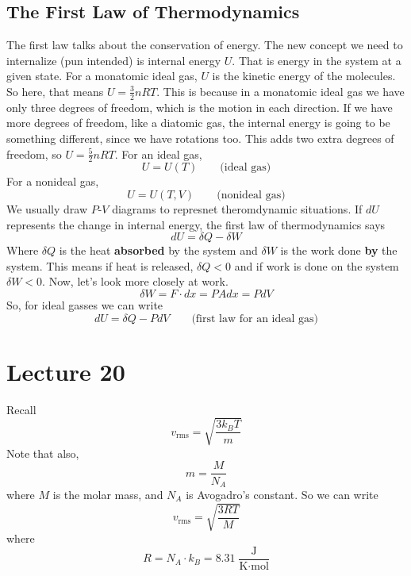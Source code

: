 \documentclass{report}
\numberwithin{equation}{section}
\begin{document}
\subsection{The First Law of Thermodynamics}
The first law talks about the conservation of energy. The new concept we need to internalize (pun intended) is internal energy $U$. That is energy in the system 
at a given state. For a monatomic ideal gas, $U$ is the kinetic energy of the molecules. So here, that means $U = \frac{3}{2}nRT$. This is because in a monatomic ideal gas we have only three degrees of freedom, which is the motion in each 
direction. If we have more degrees of freedom, like a diatomic gas, the internal energy is going to be something different, since we have rotations too. This adds two extra degrees of freedom, so $U = \frac{5}{2}nRT$. For an ideal gas,
\begin{equation}
    U = U(T) \qquad \text{(ideal gas)}
\end{equation}
For a nonideal gas, 
\begin{equation}
    U = U(T,V) \qquad \text{(nonideal gas)}
\end{equation}
We usually draw $P$-$V$ diagrams to represnet theromdynamic situations. If $dU$ represents the change in internal energy, the first law of thermodynamics says  
\begin{equation}
    dU = \delta Q - \delta W
\end{equation}
Where $\delta Q$ is the heat \textbf{absorbed} by the system and $\delta W$ is the work done \textbf{by} the system. This means if heat is released, $\delta Q <0$ and if work is done on the system $\delta W<0$. Now, let's look more closely at work.
\begin{equation}
    \delta W = F\cdot dx = PAdx = PdV
\end{equation}
So, for ideal gasses we can write 
\begin{equation}
    dU = \delta Q - PdV \qquad \text{(first law for an ideal gas)}
\end{equation}
\section{Lecture 20}
Recall
\begin{equation*}
    v_{\text{rms}} = \sqrt{\frac{3k_BT}{m}}
\end{equation*}
Note that also,
\begin{equation}
    m = \frac{M}{N_A}
\end{equation}
where $M$ is the molar mass, and $N_A$ is Avogadro's constant. So we can write
\begin{equation}
    v_{\text{rms}} = \sqrt{\frac{3RT}{M}}
\end{equation}
where
\begin{equation}
    R = N_A\cdot k_B = 8.31\;\frac{\text{J}}{\text{K}\cdot\text{mol}}
\end{equation}
\end{document}
